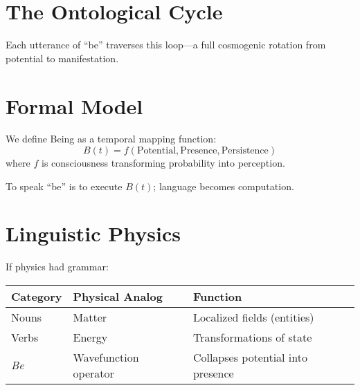 \documentclass[12pt]{article}
\begin{document}
\section{The Ontological Cycle}
\begin{center}
\end{center}

Each utterance of ``be'' traverses this loop---a full cosmogenic rotation from potential to manifestation.

\section{Formal Model}
We define Being as a temporal mapping function:
\begin{equation}
B(t) = f(\text{Potential}, \text{Presence}, \text{Persistence})
\end{equation}
where $f$ is consciousness transforming probability into perception.

To speak ``be'' is to execute $B(t)$; language becomes computation.

\section{Linguistic Physics}
If physics had grammar:
\begin{center}
\begin{tabular}{lll}
\toprule
Category & Physical Analog & Function \\
\midrule
Nouns & Matter & Localized fields (entities) \\
Verbs & Energy & Transformations of state \\
\textit{Be} & Wavefunction operator & Collapses potential into presence \\
\bottomrule
\end{tabular}
\end{center}
\end{document}
